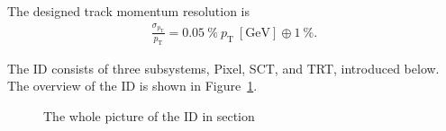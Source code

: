 The designed track momentum resolution is
\begin{eqnarray*}
    \frac{\sigma_{p_{\mathrm{T}}}}{p_{\mathrm{T}}} = 0.05~\% ~p_{\mathrm{T}}~[\mathrm{GeV}] \oplus 1~\%.
\end{eqnarray*}

The ID consists of three subsystems, Pixel, SCT, and TRT, introduced below.
The overview of the ID is shown in Figure~\ref{fig:ID}.
\begin{figure}[tbp]
\begin{center}
\caption{
The whole picture of the ID in section
}
\label{fig:ID}
\end{center}
\end{figure}

